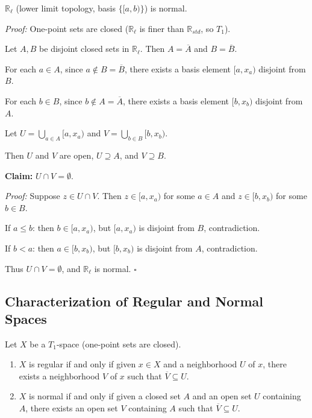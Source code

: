 \documentclass[11pt]{report}
\begin{document}
\begin{exbox}
$\mathbb{R}_\ell$ (lower limit topology, basis $\{[a, b)\}$) is normal.

\textit{Proof:} One-point sets are closed ($\mathbb{R}_\ell$ is finer than $\mathbb{R}_{std}$, so $T_1$).

Let $A, B$ be disjoint closed sets in $\mathbb{R}_\ell$. Then $A = \overline{A}$ and $B = \overline{B}$.

For each $a \in A$, since $a \notin B = \overline{B}$, there exists a basis element $[a, x_a)$ disjoint from $B$.

For each $b \in B$, since $b \notin A = \overline{A}$, there exists a basis element $[b, x_b)$ disjoint from $A$.

Let $U = \bigcup_{a \in A} [a, x_a)$ and $V = \bigcup_{b \in B} [b, x_b)$.

Then $U$ and $V$ are open, $U \supseteq A$, and $V \supseteq B$.

\textbf{Claim:} $U \cap V = \emptyset$.

\textit{Proof:} Suppose $z \in U \cap V$. Then $z \in [a, x_a)$ for some $a \in A$ and $z \in [b, x_b)$ for some $b \in B$.

If $a \leq b$: then $b \in [a, x_a)$, but $[a, x_a)$ is disjoint from $B$, contradiction.

If $b < a$: then $a \in [b, x_b)$, but $[b, x_b)$ is disjoint from $A$, contradiction.

Thus $U \cap V = \emptyset$, and $\mathbb{R}_\ell$ is normal. $\square$
\end{exbox}

\subsection{Characterization of Regular and Normal Spaces}

\begin{lembox}
Let $X$ be a $T_1$-space (one-point sets are closed).
\begin{enumerate}
    \item[(a)] $X$ is regular if and only if given $x \in X$ and a neighborhood $U$ of $x$, there exists a neighborhood $V$ of $x$ such that $\overline{V} \subseteq U$.
    \item[(b)] $X$ is normal if and only if given a closed set $A$ and an open set $U$ containing $A$, there exists an open set $V$ containing $A$ such that $\overline{V} \subseteq U$.
\end{enumerate}
\end{lembox}
\end{document}
